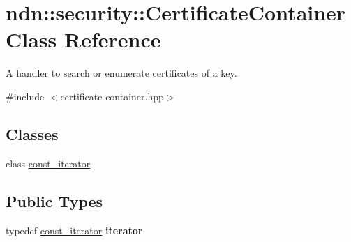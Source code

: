 \hypertarget{classndn_1_1security_1_1CertificateContainer}{}\section{ndn\+:\+:security\+:\+:Certificate\+Container Class Reference}
\label{classndn_1_1security_1_1CertificateContainer}


A handler to search or enumerate certificates of a key.  




{\ttfamily \#include $<$certificate-\/container.\+hpp$>$}

\subsection*{Classes}
\begin{DoxyCompactItemize}
\item 
class \hyperlink{classndn_1_1security_1_1CertificateContainer_1_1const__iterator}{const\+\_\+iterator}
\end{DoxyCompactItemize}
\subsection*{Public Types}
\begin{DoxyCompactItemize}
\item 
typedef \hyperlink{classndn_1_1security_1_1CertificateContainer_1_1const__iterator}{const\+\_\+iterator} {\bfseries iterator}\hypertarget{classndn_1_1security_1_1CertificateContainer_a40dfbba4aa0495fafc8f7f1131782f85}{}\label{classndn_1_1security_1_1CertificateContainer_a40dfbba4aa0495fafc8f7f1131782f85}

\end{DoxyCompactItemize}
